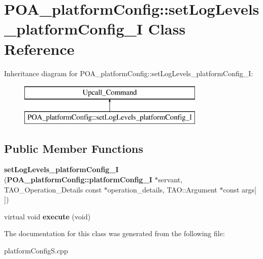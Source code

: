 \section{P\+O\+A\+\_\+platform\+Config\+:\+:set\+Log\+Levels\+\_\+platform\+Config\+\_\+I Class Reference}
\label{classPOA__platformConfig_1_1setLogLevels__platformConfig__I}
Inheritance diagram for P\+O\+A\+\_\+platform\+Config\+:\+:set\+Log\+Levels\+\_\+platform\+Config\+\_\+I\+:\begin{figure}[H]
\begin{center}
\leavevmode
\includegraphics[height=2.000000cm]{classPOA__platformConfig_1_1setLogLevels__platformConfig__I}
\end{center}
\end{figure}
\subsection*{Public Member Functions}
\begin{DoxyCompactItemize}
\item 
{\bfseries set\+Log\+Levels\+\_\+platform\+Config\+\_\+I} ({\bf P\+O\+A\+\_\+platform\+Config\+::platform\+Config\+\_\+I} $\ast$servant, T\+A\+O\+\_\+\+Operation\+\_\+\+Details const $\ast$operation\+\_\+details, T\+A\+O\+::\+Argument $\ast$const args[$\,$])\label{classPOA__platformConfig_1_1setLogLevels__platformConfig__I_ae5c03cfb2bf1cdce648cb343de247533}

\item 
virtual void {\bfseries execute} (void)\label{classPOA__platformConfig_1_1setLogLevels__platformConfig__I_ae3a9606f60431a5ff19a437f2f30e732}

\end{DoxyCompactItemize}


The documentation for this class was generated from the following file\+:\begin{DoxyCompactItemize}
\item 
platform\+Config\+S.\+cpp\end{DoxyCompactItemize}
